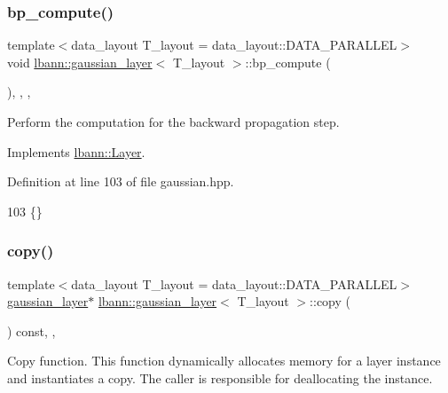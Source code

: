 \subsubsection{\texorpdfstring{bp\+\_\+compute()}{bp\_compute()}}
{\footnotesize\ttfamily template$<$data\+\_\+layout T\+\_\+layout = data\+\_\+layout\+::\+D\+A\+T\+A\+\_\+\+P\+A\+R\+A\+L\+L\+EL$>$ \\
void \hyperlink{classlbann_1_1gaussian__layer}{lbann\+::gaussian\+\_\+layer}$<$ T\+\_\+layout $>$\+::bp\+\_\+compute (\begin{DoxyParamCaption}{ }\end{DoxyParamCaption})\hspace{0.3cm}{\ttfamily [inline]}, {\ttfamily [override]}, {\ttfamily [protected]}, {\ttfamily [virtual]}}

Perform the computation for the backward propagation step. 

Implements \hyperlink{classlbann_1_1Layer_a7442e01f9ee1294df2de811efcf5171e}{lbann\+::\+Layer}.



Definition at line 103 of file gaussian.\+hpp.


\begin{DoxyCode}
103 \{\}
\end{DoxyCode}
\mbox{\label{classlbann_1_1gaussian__layer_af8522e7d3c3da9a123180b49d9110367}} 
\subsubsection{\texorpdfstring{copy()}{copy()}}
{\footnotesize\ttfamily template$<$data\+\_\+layout T\+\_\+layout = data\+\_\+layout\+::\+D\+A\+T\+A\+\_\+\+P\+A\+R\+A\+L\+L\+EL$>$ \\
\hyperlink{classlbann_1_1gaussian__layer}{gaussian\+\_\+layer}$\ast$ \hyperlink{classlbann_1_1gaussian__layer}{lbann\+::gaussian\+\_\+layer}$<$ T\+\_\+layout $>$\+::copy (\begin{DoxyParamCaption}{ }\end{DoxyParamCaption}) const\hspace{0.3cm}{\ttfamily [inline]}, {\ttfamily [override]}, {\ttfamily [virtual]}}

Copy function. This function dynamically allocates memory for a layer instance and instantiates a copy. The caller is responsible for deallocating the instance. 

